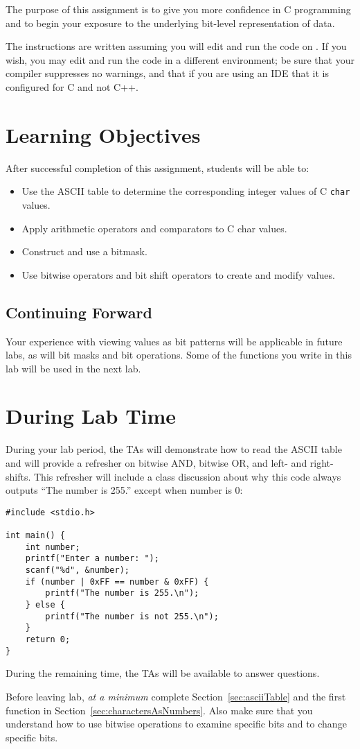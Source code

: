 The purpose of this assignment is to give you more confidence in C programming and to begin your exposure to the underlying bit-level representation of data.

The instructions are written assuming you will edit and run the code on \runtimeenvironment.
If you wish, you may edit and run the code in a different environment;
be sure that your compiler suppresses no warnings, and that if you are using an IDE that it is configured for C and not C++.

\section*{Learning Objectives}

After successful completion of this assignment, students will be able to:
\begin{itemize}
    \item Use the ASCII table to determine the corresponding integer values of C \lstinline{char} values.
    \item Apply arithmetic operators and comparators to C \lstinline{}{char} values.
    \item Construct and use a bitmask.
    \item Use bitwise operators and bit shift operators to create and modify values.
\end{itemize}

\subsection*{Continuing Forward}

Your experience with viewing values as bit patterns will be applicable in future labs, as will bit masks and bit operations.
Some of the functions you write in this lab will be used in the next lab.

\section*{During Lab Time}

During your lab period, the TAs will demonstrate how to read the ASCII table and will provide a refresher on bitwise AND, bitwise OR, and left- and right-shifts.
This refresher will include a class discussion about why this code always outputs ``The number is 255.'' except when number is 0:
\begin{lstlisting}
#include <stdio.h>

int main() {
    int number;
    printf("Enter a number: ");
    scanf("%d", &number);
    if (number | 0xFF == number & 0xFF) {
        printf("The number is 255.\n");
    } else {
        printf("The number is not 255.\n");
    }
    return 0;
}
\end{lstlisting}
During the remaining time, the TAs will be available to answer questions.

Before leaving lab, \textit{at a minimum} complete Section~\ref{sec:asciiTable} and the first function in Section~\ref{sec:charactersAsNumbers}.
Also make sure that you understand how to use bitwise operations to examine specific bits and to change specific bits.
